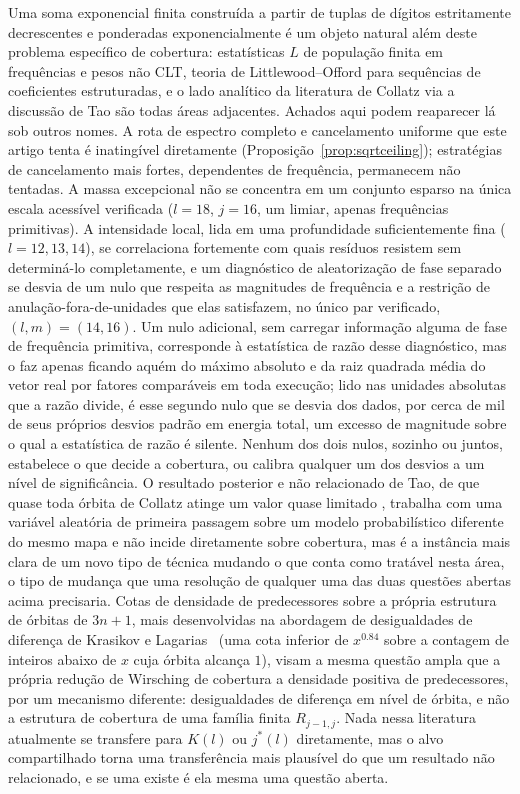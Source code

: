 \documentclass[11pt]{amsart}
\theoremstyle{plain}
\theoremstyle{definition}
\theoremstyle{remark}
\begin{document}
Uma soma exponencial finita construída a partir de tuplas de dígitos estritamente decrescentes e
ponderadas exponencialmente é um objeto natural além deste problema específico de cobertura:
estatísticas $L$ de população finita em frequências e pesos não CLT, teoria de Littlewood--Offord
para sequências de coeficientes estruturadas, e o lado analítico da literatura de Collatz via a
discussão de Tao são todas áreas adjacentes. Achados aqui podem reaparecer lá sob outros nomes. A
rota de espectro completo e cancelamento uniforme que este artigo tenta é inatingível diretamente
(Proposição~\ref{prop:sqrtceiling}); estratégias de cancelamento mais fortes, dependentes de
frequência, permanecem não tentadas. A massa excepcional não se concentra em um conjunto esparso na
única escala acessível verificada ($l=18$, $j=16$, um limiar, apenas frequências primitivas). A
intensidade local, lida em uma profundidade suficientemente fina ($l=12,13,14$), se correlaciona
fortemente com quais resíduos resistem sem determiná-lo completamente, e um diagnóstico de
aleatorização de fase separado se desvia de um nulo que respeita as magnitudes de frequência e a
restrição de anulação-fora-de-unidades que elas satisfazem, no único par verificado,
$(l,m)=(14,16)$. Um nulo adicional, sem carregar informação alguma de fase de frequência
primitiva, corresponde à estatística de razão desse diagnóstico, mas o faz apenas ficando aquém do
máximo absoluto e da raiz quadrada média do vetor real por fatores comparáveis em toda execução;
lido nas unidades absolutas que a razão divide, é esse segundo nulo que se desvia dos dados, por
cerca de mil de seus próprios desvios padrão em energia total, um excesso de magnitude sobre o qual
a estatística de razão é silente. Nenhum dos dois nulos, sozinho ou juntos, estabelece o que decide
a cobertura, ou calibra qualquer um dos desvios a um nível de significância. O resultado posterior
e não relacionado de Tao, de que quase toda órbita de Collatz atinge um valor quase limitado
\cite{tao2019}, trabalha com uma variável aleatória de primeira passagem sobre um modelo
probabilístico diferente do mesmo mapa e não incide diretamente sobre cobertura, mas é a instância
mais clara de um novo tipo de técnica mudando o que conta como tratável nesta área, o tipo de
mudança que uma resolução de qualquer uma das duas questões abertas acima precisaria. Cotas de
densidade de predecessores sobre a própria estrutura de órbitas de $3n+1$, mais desenvolvidas na
abordagem de desigualdades de diferença de Krasikov e Lagarias~\cite{krasikovlagarias2003} (uma
cota inferior de $x^{0.84}$ sobre a contagem de inteiros abaixo de $x$ cuja órbita alcança $1$),
visam a mesma questão ampla que a própria redução de Wirsching de cobertura a densidade positiva de
predecessores, por um mecanismo diferente: desigualdades de diferença em nível de órbita, e não a
estrutura de cobertura de uma família finita $R_{j-1,j}$. Nada nessa literatura atualmente se
transfere para $K(l)$ ou $j^*(l)$ diretamente, mas o alvo compartilhado torna uma transferência
mais plausível do que um resultado não relacionado, e se uma existe é ela mesma uma questão aberta.
\end{document}
